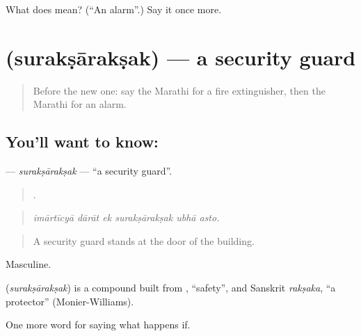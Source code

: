 \begin{tcolorbox}[breakable,colback=teal!4,colframe=teal!35!black,title={Before you move on}]
What does  mean? (\textquotedblleft{}An alarm\textquotedblright{}.) Say it once more.
\end{tcolorbox}
\section[\texorpdfstring{\mr{सुरक्षारक्षक} (surakṣārakṣak)}{सुरक्षारक्षक (surakṣārakṣak)}]{ (surakṣārakṣak) — a security guard}

\label{lesson:MR-C547-suraksaraksak}



\begin{quote}
Before the new one: say the Marathi for a fire extinguisher, then the Marathi for an alarm.
\end{quote}

\subsection*{You'll want to know: }
\textbf{} — \emph{surakṣārakṣak} — \textquotedblleft{}a security guard\textquotedblright{}.

\begin{quote}
     .
\end{quote}

\begin{quote}
\emph{imārtīcyā dārāt ek surakṣārakṣak ubhā asto.}
\end{quote}

\begin{quote}
A security guard stands at the door of the building.
\end{quote}

Masculine.

\begin{cousinweb}
\textbf{} (\emph{surakṣārakṣak}) is a compound built from , \textquotedblleft{}safety\textquotedblright{}, and Sanskrit \emph{rakṣaka}, \textquotedblleft{}a protector\textquotedblright{} (Monier-Williams).
\end{cousinweb}

\begin{grammarlens}[title={What you've built}]
One more word for saying what happens if.
\end{grammarlens}

